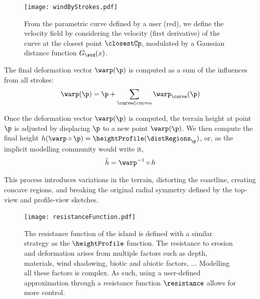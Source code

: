 
\begin{figure}
    \texttt{[image: windByStrokes.pdf]}
    \caption{From the parametric curve defined by a user (red), we define the velocity field by considering the velocity (first derivative) of the curve at the closest point $\closestCp$, modulated by a Gaussian distance function $G_{\std}(x)$.}
    \label{fig:coral-island-wind-from-strokes}
\end{figure}

The final deformation vector $\warp(\p)$ is computed as a sum of the influences from all strokes: 
\begin{align}
    \warp(\p) = \p + \sum_{\curve \in \text{curves}} \warp_\curve(\p) 
\end{align}

Once the deformation vector $\warp(\p)$ is computed, the terrain height at point $\p$ is adjusted by displacing $\p$ to a new point $\warp(\p)$.
We then compute the final height $h(\warp \circ \p) = \heightProfile(\distRegions_{\p})$, or, as the implicit modelling community would write it,
\begin{align}
    \Tilde{h} = \warp^{-1} \circ h
\end{align}

This process introduces variations in the terrain, distorting the coastline, creating concave regions, and breaking the original radial symmetry defined by the top-view and profile-view sketches.


\begin{figure}
    \texttt{[image: resistanceFunction.pdf]}
    \caption{The resistance function of the island is defined with a similar strategy as the $\heightProfile$ function. The resistance to erosion and deformation arises from multiple factors such as depth, materials, wind shadowing, biotic and abiotic factors, ... Modelling all these factors is complex. As such, using a user-defined approximation through a resistance function $\resistance$ allows for more control.}
    \label{fig:coral-island-resistance-function}
\end{figure}


